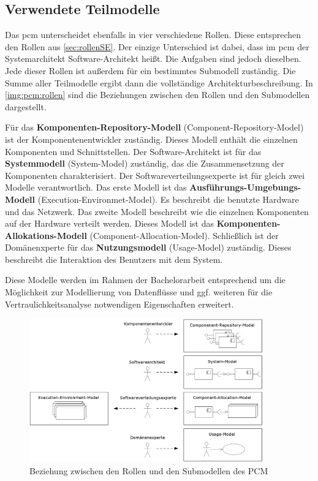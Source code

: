 \subsection{Verwendete Teilmodelle}
\label{sec:submodell}
Das \gls{pcm} unterscheidet ebenfalls in vier verschiedene Rollen. Diese entsprechen den Rollen aus \autoref{sec:rollenSE}. Der einzige Unterschied ist dabei, dass im \gls{pcm} der Systemarchitekt Software-Architekt heißt. Die Aufgaben sind jedoch dieselben. Jede dieser Rollen ist außerdem für ein bestimmtes Submodell zuständig. Die Summe aller Teilmodelle ergibt dann die vollständige Architekturbeschreibung. In \autoref{img:pcm:rollen} sind die Beziehungen zwischen den Rollen und den Submodellen dargestellt. \par
Für das \textbf{Komponenten-Repository-Modell} (Component-Repository-Model) ist der Komponentenentwickler zuständig. Dieses Modell enthält die einzelnen Komponenten und Schnittstellen. Der Software-Architekt ist für das \textbf{Systemmodell} (System-Model) zuständig, das die Zusammensetzung der Komponenten charakterisiert. Der Softwareverteilungsexperte ist für gleich zwei Modelle verantwortlich. Das erste Modell ist das \textbf{Ausführungs-Umgebungs-Modell} (Execution-Environmet-Model). Es beschreibt die benutzte Hardware und das Netzwerk. Das zweite Modell beschreibt wie die einzelnen Komponenten auf der Hardware verteilt werden. Dieses Modell ist das \textbf{Komponenten-Allokations-Modell} (Component-Allocation-Model). Schließlich ist der Domänenxperte für das \textbf{Nutzungsmodell} (Usage-Model) zuständig. Dieses beschreibt die Interaktion des Benutzers mit dem System. \par
Diese Modelle werden im Rahmen der Bachelorarbeit entsprechend um die Möglichkeit zur Modellierung von Datenflüsse und ggf. weiteren für die Vertraulichkeitsanalyse notwendigen Eigenschaften erweitert.
\begin{figure}[h]
	\centering
  	\includegraphics[width=0.9\textwidth]{images/pcm_rollen.png}
	\caption{Beziehung zwischen den Rollen und den Submodellen des PCM}
	\label{img:pcm:rollen}
\end{figure}

